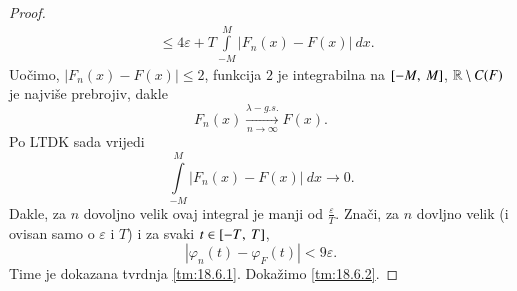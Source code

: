 \begin{proof}
\begin{equation*}
\begin{aligned}
            &\leq 4 \varepsilon + T \int\limits_{-M}^{M} |F_n (x) - F (x)| \: dx.
        \end{aligned}
    \end{equation*}
    Uo\v cimo, $|F_n (x) - F (x)| \leq 2$, funkcija $2$ je integrabilna na $[{-M}, \:{M}]$, $\mathbb{R} \setminus C(F)$ je najvi\v se prebrojiv, dakle
    \begin{equation*}
        F_n (x) \xrightarrow[n \to \infty]{\lambda-g.s.} F(x).
    \end{equation*}
    Po LTDK sada vrijedi
    \begin{equation*}
        \int\limits_{-M}^M |F_n (x) - F(x)| \: d x \to 0.
    \end{equation*}
    Dakle, za $n$ dovoljno velik ovaj integral je manji od $\frac{\varepsilon}{T}$.
    Zna\v ci, za $n$ dovljno velik (i ovisan samo o $\varepsilon$ i $T$) i za svaki $t \in [{-T}, \:{T}]$,
    \begin{equation*}
        |\varphi_n (t) - \varphi_F (t)| < 9 \varepsilon.
    \end{equation*}
    Time je dokazana tvrdnja \ref{tm:18.6.1}.
    Doka\v zimo \ref{tm:18.6.2}.


\end{proof}
